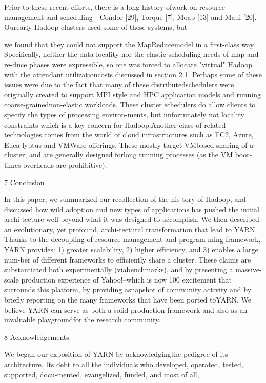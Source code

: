 Prior to these recent efforts, there is a long history ofwork on resource management and scheduling - Condor [29], Torque [7], Moab [13] and Maui [20]. Ourearly Hadoop clusters used some of these systems, but

we found that they could not support the MapReducemodel in a first-class way. Specifically, neither the data
locality nor the elastic scheduling needs of map and re-duce phases were expressible, so one was forced to allocate "virtual" Hadoop with the attendant utilizationcosts discussed in section 2.1. Perhaps some of these issues were due to the fact that many of these distributedschedulers were originally created to support MPI style
and HPC application models and running coarse-grainednon-elastic workloads. These cluster schedulers do allow clients to specify the types of processing environ-ments, but unfortunately not locality constraints which
is a key concern for Hadoop.Another class of related technologies comes from the
world of cloud infrastructures such as EC2, Azure, Euca-lyptus and VMWare offerings. These mostly target VMbased sharing of a cluster, and are generally designed forlong running processes (as the VM boot-times overheads
are prohibitive).

7 Conclusion

In this paper, we summarized our recollection of the his-tory of Hadoop, and discussed how wild adoption and
new types of applications has pushed the initial archi-tecture well beyond what it was designed to accomplish.
We then described an evolutionary, yet profound, archi-tectural transformation that lead to YARN. Thanks to
the decoupling of resource management and program-ming framework, YARN provides: 1) greater scalability, 2) higher efficiency, and 3) enables a large num-ber of different frameworks to efficiently share a cluster.
These claims are substantiated both experimentally (viabenchmarks), and by presenting a massive-scale production experience of Yahoo!--which is now 100%
excitement that surrounds this platform, by providing asnapshot of community activity and by briefly reporting on the many frameworks that have been ported toYARN. We believe YARN can serve as both a solid production framework and also as an invaluable playgroundfor the research community.

8 Acknowledgements

We began our exposition of YARN by acknowledgingthe pedigree of its architecture. Its debt to all the individuals who developed, operated, tested, supported, docu-mented, evangelized, funded, and most of all,

